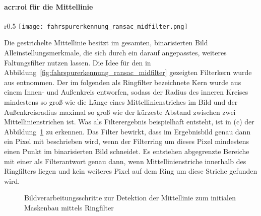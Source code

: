 \paragraph{\gls{acr:roi} für die Mittellinie}

\begin{wrapfigure}{r}{0.5\textwidth}
	\centering
	\texttt{[image: fahrspurerkennung\_ransac\_midfilter.png]}
	\caption{Der Kern des \\ \glqq Ringfilters\grqq}
	\label{fig:fahrspurerkennung_ransac_midfilter}
\end{wrapfigure} 

Die gestrichelte Mittellinie besitzt im gesamten, binarisierten Bild Alleinstellungsmerkmale, die sich durch ein darauf angepasstes, weiteres Faltungsfilter nutzen lassen. Die Idee für den in Abbildung~\ref{fig:fahrspurerkennung_ransac_midfilter} gezeigten Filterkern wurde aus \autocite{drauschkeEchtzeitfaehigeStartpunktalgorithmenFuer2016} entnommen. Der im folgenden als \glqq Ringfilter\grqq{} bezeichnete Kern wurde aus einem Innen- und Außenkreis entworfen, sodass der Radius des inneren Kreises mindestens so groß wie die Länge eines Mittellinienstriches im Bild und der Außenkreisradius maximal so groß wie der kürzeste Abstand zwischen zwei Mittellinienstrichen ist. Was als Filterergebnis beispielhaft entsteht, ist in (c) der Abbildung~\ref{fig:fahrspurerkennung_ransac_binarisieren} zu erkennen. Das Filter bewirkt, dass im Ergebnisbild genau dann ein Pixel mit \grqq{} beschrieben wird, wenn der Filterring um dieses Pixel mindestens einen Punkt im binarisierten Bild schneidet. Es entstehen abgegrenzte Bereiche mit einer \grqq{} als Filterantwort genau dann, wenn Mittellinienstriche innerhalb des \glqq Ringfilters\grqq{} liegen und kein weiteres Pixel auf dem Ring um diese Striche gefunden wird. 

\begin{figure}[htbp]
	\centering
	\hfill
	\hfill
	\hfill
	\caption{Bildverarbeitungsschritte zur Detektion der Mittellinie zum initialen Maskenbau mittels \glqq Ringfilter\grqq}
	\label{fig:fahrspurerkennung_ransac_binarisieren}
\end{figure} 

